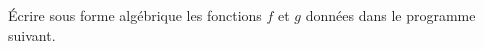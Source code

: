 
\begin{exercice}\label{exosmath-0043}

    Écrire sous forme algébrique les fonctions \( f\) et \( g\) données dans le programme suivant.

\end{exercice}
